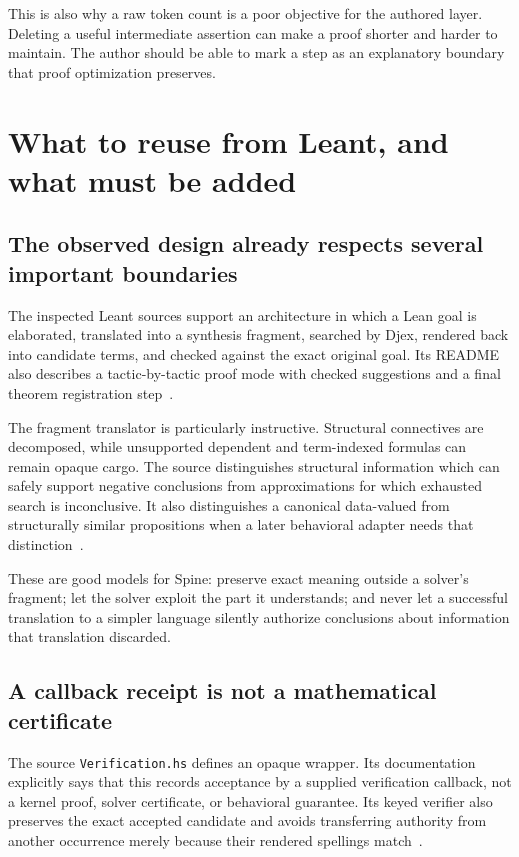 \documentclass[11pt,letterpaper]{article}
\theoremstyle{definition}
\theoremstyle{remark}
\newcommand{\Spine}{Spine}
\newcommand{\code}[1]{\texttt{\detokenize{#1}}}
\newcommand{\decl}[1]{{\small\urlstyle{tt}\nolinkurl{#1}}}
\begin{document}
This is also why a raw token count is a poor objective for the authored layer. Deleting a useful intermediate assertion can make a proof shorter and harder to maintain. The author should be able to mark a step as an explanatory boundary that proof optimization preserves.

\section{What to reuse from Leant, and what must be added}
\label{sec:leant}
\subsection{The observed design already respects several important boundaries}
The inspected Leant sources support an architecture in which a Lean goal is elaborated, translated into a synthesis fragment, searched by Djex, rendered back into candidate terms, and checked against the exact original goal. Its README also describes a tactic-by-tactic proof mode with checked suggestions and a final theorem registration step~\cite{leant-readme,fragment}.

The fragment translator is particularly instructive. Structural connectives are decomposed, while unsupported dependent and term-indexed formulas can remain opaque cargo. The source distinguishes structural information which can safely support negative conclusions from approximations for which exhausted search is inconclusive. It also distinguishes a canonical data-valued \code{Prod} from structurally similar propositions when a later behavioral adapter needs that distinction~\cite{fragment}.

These are good models for \Spine{}: preserve exact meaning outside a solver's fragment; let the solver exploit the part it understands; and never let a successful translation to a simpler language silently authorize conclusions about information that translation discarded.

\subsection{A callback receipt is not a mathematical certificate}
The source \decl{Verification.hs} defines an opaque \code{Verified candidate} wrapper. Its documentation explicitly says that this records acceptance by a supplied verification callback, not a kernel proof, solver certificate, or behavioral guarantee. Its keyed verifier also preserves the exact accepted candidate and avoids transferring authority from another occurrence merely because their rendered spellings match~\cite{verification}.
\end{document}
